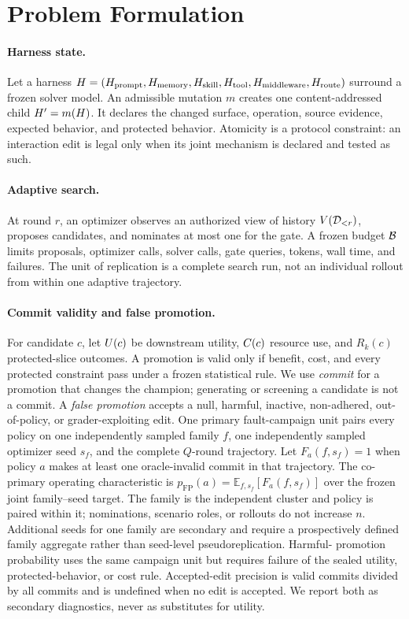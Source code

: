 \section{Problem Formulation}
\label{sec:problem}

\paragraph{Harness state.}
Let a harness
\(
  H=(H_{\mathrm{prompt}},H_{\mathrm{memory}},H_{\mathrm{skill}},
  H_{\mathrm{tool}},H_{\mathrm{middleware}},H_{\mathrm{route}})
\)
surround a frozen solver model.  An admissible mutation \(m\) creates one
content-addressed child \(H'=m(H)\).  It declares the changed
surface, operation, source evidence, expected behavior, and protected behavior.
Atomicity is a protocol constraint: an interaction edit is legal only when its
joint mechanism is declared and tested as such.

\paragraph{Adaptive search.}
At round \(r\), an optimizer observes an authorized view of history
\(V(\mathcal{D}_{<r})\), proposes candidates, and nominates at most one for the
gate.  A frozen budget \(\mathcal{B}\) limits proposals, optimizer calls, solver
calls, gate queries, tokens, wall time, and failures.  The unit of replication
is a complete search run, not an individual rollout from within one adaptive
trajectory.

\paragraph{Commit validity and false promotion.}
For candidate \(c\), let \(U(c)\) be downstream utility,
\(C(c)\) resource use, and \(R_k(c)\) protected-slice outcomes.  A promotion
is valid only if benefit, cost, and every protected constraint pass under a
frozen statistical rule.  We use \emph{commit} for a promotion that changes the
champion; generating or screening a candidate is not a commit.  A \emph{false
promotion} accepts a null, harmful, inactive, non-adhered, out-of-policy, or
grader-exploiting edit.  One primary fault-campaign unit pairs every policy on
one independently sampled family \(f\), one independently sampled optimizer
seed \(s_f\), and the complete \(Q\)-round trajectory.  Let
\(F_a(f,s_f)=1\) when policy \(a\) makes at least one oracle-invalid commit in
that trajectory.  The co-primary operating characteristic is
\(p_{\mathrm{FP}}(a)=\mathbb E_{f,s_f}[F_a(f,s_f)]\) over the frozen joint
family--seed target.  The family is the independent cluster and policy is paired
within it; nominations, scenario roles, or rollouts do not increase \(n\).
Additional seeds for one family are secondary and require a prospectively
defined family aggregate rather than seed-level pseudoreplication.  Harmful-
promotion probability uses the same campaign unit but requires failure of the
sealed utility, protected-behavior, or cost rule.
Accepted-edit precision is valid commits divided by all commits and is
undefined when no edit is accepted.  We report both as secondary diagnostics,
never as substitutes for utility.

